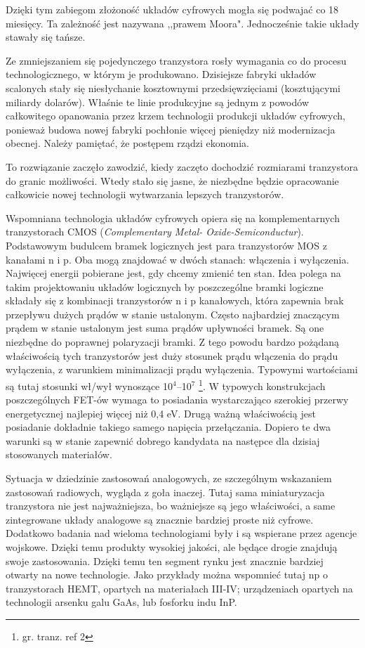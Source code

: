 Dzięki tym zabiegom złożoność układów cyfrowych mogła się podwajać co 18 miesięcy. Ta zależność jest nazywana ,,prawem
Moora". Jednocześnie takie układy stawały się tańsze.

Ze zmniejszaniem się pojedynczego tranzystora rosły wymagania co do procesu technologicznego, w którym je produkowano.
Dzisiejsze fabryki układów scalonych stały się niesłychanie kosztownymi przedsięwzięciami (kosztującymi miliardy dolarów).
Właśnie te linie produkcyjne są jednym z powodów całkowitego opanowania przez krzem technologii produkcji układów
 cyfrowych, ponieważ budowa nowej fabryki pochłonie więcej pieniędzy niż modernizacja obecnej. Należy pamiętać, że postępem
rządzi ekonomia.

To rozwiązanie zaczęło zawodzić, kiedy zaczęto dochodzić rozmiarami tranzystora do granic możliwości. Wtedy stało się jasne,
że niezbędne będzie opracowanie całkowicie nowej technologii wytwarzania lepszych tranzystorów.

Wspomniana technologia układów cyfrowych opiera się na komplementarnych tranzystorach CMOS (\textit{Complementary Metal-
Oxide-Semiconductur}). Podstawowym budulcem bramek logicznych jest para tranzystorów MOS z kanałami n i p. Oba mogą 
znajdować w dwóch stanach: włączenia i wyłączenia. Najwięcej energii pobierane jest, gdy chcemy zmienić ten stan. 
Idea polega na takim projektowaniu układów logicznych by poszczególne bramki logiczne składały się z kombinacji
tranzystorów n i p kanałowych, która zapewnia brak przepływu dużych prądów w stanie ustalonym. Często najbardziej znaczącym
prądem w stanie ustalonym jest suma prądów upływności bramek. Są one niezbędne do poprawnej polaryzacji bramki.
Z tego powodu bardzo pożądaną właściwością tych tranzystorów jest duży stosunek prądu włączenia do prądu wyłączenia, z 
warunkiem minimalizacji prądu wyłączenia. Typowymi wartościami są tutaj stosunki wł/wył wynoszące 10$^4$--10$^7$
\footnote{gr. tranz. ref 2}.  W typowych konstrukcjach poszczególnych FET-ów wymaga to posiadania wystarczająco szerokiej
przerwy energetycznej najlepiej więcej niż 0,4 eV. Drugą ważną właściwością jest posiadanie dokładnie takiego samego
napięcia przełączania. Dopiero te dwa warunki są w stanie zapewnić dobrego kandydata na następce dla dzisiaj stosowanych
materiałów.


Sytuacja w dziedzinie zastosowań analogowych, ze szczególnym wskazaniem zastosowań radiowych, wygląda z goła inaczej. 
Tutaj sama miniaturyzacja tranzystora nie jest najważniejsza, bo ważniejsze są jego właściwości, a same zintegrowane układy
analogowe są znacznie bardziej proste niż cyfrowe. Dodatkowo badania nad wieloma technologiami były i są wspierane przez
 agencje wojskowe. Dzięki temu produkty wysokiej jakości, ale będące drogie znajdują swoje zastosowania. Dzięki temu ten
 segment rynku jest znacznie bardziej otwarty na nowe technologie. Jako przykłady można wspomnieć tutaj np o tranzystorach
HEMT, opartych na materiałach III-IV; urządzeniach opartych na technologii arsenku galu GaAs, lub fosforku indu InP.


